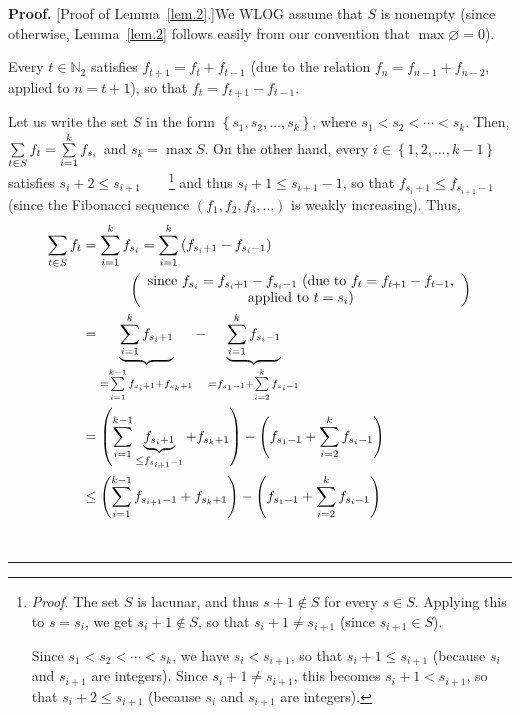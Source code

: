 \documentclass[numbers=enddot,12pt,final,onecolumn,notitlepage]{scrartcl}%
\numberwithin{exer}{section}
\theoremstyle{definition}
\newenvironment{proof}[1][Proof]{\noindent\textbf{#1.} }{\ \rule{0.5em}{0.5em}}
\let\sumnonlimits\sum
\renewcommand{\sum}{\sumnonlimits\limits}
\begin{document}
\begin{proof}
[Proof of Lemma~\ref{lem.2}.]We WLOG assume that $S$ is nonempty (since
otherwise, Lemma~\ref{lem.2} follows easily from our convention that
$\max\varnothing= 0$).

Every $t\in\mathbb{N}_{2}$ satisfies $f_{t+1}=f_{t}+f_{t-1}$ (due to the
relation $f_{n}=f_{n-1}+f_{n-2}$, applied to $n=t+1$), so that $f_{t}%
=f_{t+1}-f_{t-1}$.

Let us write the set $S$ in the form $\left\{  s_{1},s_{2},\ldots
,s_{k}\right\}  $, where $s_{1}<s_{2}<\cdots<s_{k}$. Then, $\sum\limits_{t\in
S}f_{t}=\sum\limits_{i=1}^{k}f_{s_{i}}$ and $s_{k}=\max S$. On the other hand,
every $i\in\left\{  1,2,\ldots,k-1\right\}  $ satisfies $s_{i}+2\leq s_{i+1}%
$\ \ \ \ \footnote{\textit{Proof.} The set $S$ is lacunar, and thus $s+1\notin
S$ for every $s\in S$. Applying this to $s=s_{i}$, we get $s_{i}+1\notin S$,
so that $s_{i}+1\neq s_{i+1}$ (since $s_{i+1}\in S$).
\par
Since $s_{1}<s_{2}<\cdots<s_{k}$, we have $s_{i}<s_{i+1}$, so that
$s_{i}+1\leq s_{i+1}$ (because $s_{i}$ and $s_{i+1}$ are integers). Since
$s_{i}+1\neq s_{i+1}$, this becomes $s_{i}+1<s_{i+1}$, so that $s_{i}+2\leq
s_{i+1}$ (because $s_{i}$ and $s_{i+1}$ are integers).} and thus $s_{i}+1\leq
s_{i+1}-1$, so that $f_{s_{i}+1}\leq f_{s_{i+1}-1}$ (since the Fibonacci
sequence $\left(  f_{1},f_{2},f_{3},\ldots\right)  $ is weakly increasing).
Thus,%
\begin{align*}
\sum\limits_{t\in S}f_{t}  &  =\sum\limits_{i=1}^{k}f_{s_{i}}=\sum
\limits_{i=1}^{k}\left(  f_{s_{i}+1}-f_{s_{i}-1}\right) \\
&  \ \ \ \ \ \ \ \ \ \ \left(
\begin{array}
[c]{c}%
\text{since }f_{s_{i}}=f_{s_{i}+1}-f_{s_{i}-1}\text{ (due to }f_{t}%
=f_{t+1}-f_{t-1}\text{,}\\
\text{applied to }t=s_{i}\text{)}%
\end{array}
\right) \\
&  =\underbrace{\sum\limits_{i=1}^{k}f_{s_{i}+1}}_{=\sum\limits_{i=1}%
^{k-1}f_{s_{i}+1}+f_{s_{k}+1}}-\underbrace{\sum\limits_{i=1}^{k}f_{s_{i}-1}%
}_{=f_{s_{1}-1}+\sum\limits_{i=2}^{k}f_{s_{i}-1}}\\
&  =\left(  \sum\limits_{i=1}^{k-1}\underbrace{f_{s_{i}+1}}_{\leq
f_{s_{i+1}-1}}+f_{s_{k}+1}\right)  -\left(  f_{s_{1}-1}+\sum\limits_{i=2}%
^{k}f_{s_{i}-1}\right) \\
&  \leq\left(  \sum\limits_{i=1}^{k-1}f_{s_{i+1}-1}+f_{s_{k}+1}\right)
-\left(  f_{s_{1}-1}+\sum\limits_{i=2}^{k}f_{s_{i}-1}\right) \\

\end{align*}
\end{proof}
\end{document}
